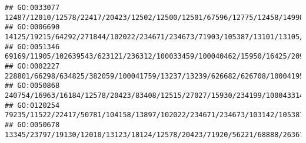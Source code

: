 \documentclass[
]{article}
\begin{document}
\begin{verbatim}
## GO:0033077                                                                                                                                                                                                                                                                                                                    12487/12010/12578/22417/20423/12502/12500/12501/67596/12775/12458/14998/16149/20371/16186
## GO:0006690                                                                                                                                                                                                                                                                                         14125/19215/64292/271844/102022/234671/234673/71903/105387/13101/13105/380997/223706/631304/13078/16149/72082/433247
## GO:0051346                                                                                                                                                                                                                             69169/11905/102639543/623121/236312/100033459/100040462/15950/16425/209378/13011/20568/20617/27007/12047/18054/20701/20704/71907/15160/268885/433016/20861/100034684/20862/15511
## GO:0002227                                                                                                                                                                                                                                                                                                                        228801/66298/634825/382059/100041759/13237/13239/626682/626708/100041952/503491/11808
## GO:0050868                                                                                                                                                                                                                                                                                                 240754/16963/16184/12578/20423/83408/12515/27027/15930/234199/100043314/208154/14960/16149/60533/58205/20371
## GO:0120254                                                                                                                                                                                                                                                                            79235/11522/22417/50781/104158/13897/102022/234671/234673/103142/105387/13101/13105/380997/223706/58226/631304/13078/72082/433247
## GO:0050678                                                                                                                                                                                                          13345/23797/19130/12010/13123/18124/12578/20423/71920/56221/68888/26367/100038489/12554/16160/20304/18053/20666/20474/13386/75745/14165/18092/18095/15117/57277/22337/16682/21380/19876/12766/12229

\end{verbatim}
\end{document}
